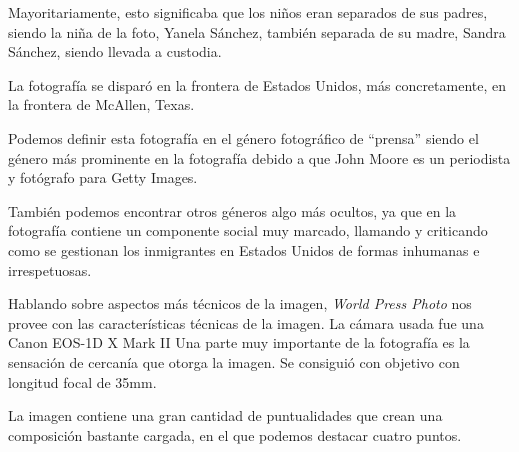 \documentclass[11pt,a4paper]{article}
\begin{document}
Mayoritariamente, esto significaba que los niños eran separados de sus padres, siendo la niña de la foto, Yanela Sánchez, también separada de su madre, Sandra Sánchez, siendo llevada a custodia. 

La fotografía se disparó en la frontera de Estados Unidos, más concretamente, en la frontera de McAllen, Texas. 

\hrulefill

Podemos definir esta fotografía en el género fotográfico de “prensa” siendo el género más prominente en la fotografía debido a que John Moore es un periodista y fotógrafo para Getty Images. %

También podemos encontrar otros géneros algo más ocultos, ya que en la fotografía contiene un componente social muy marcado, llamando y criticando como se gestionan los inmigrantes en Estados Unidos de formas inhumanas e irrespetuosas. 

Hablando sobre aspectos más técnicos de la imagen, \textit{World Press Photo} nos provee con las características técnicas de la imagen. 
La cámara usada fue una Canon EOS-1D X Mark II %
Una parte muy importante de la fotografía es la sensación de cercanía que otorga la imagen. Se consiguió con objetivo con longitud focal de 35mm.


La imagen contiene una gran cantidad de puntualidades que crean una composición bastante cargada, en el que podemos destacar cuatro puntos. 
\end{document}
